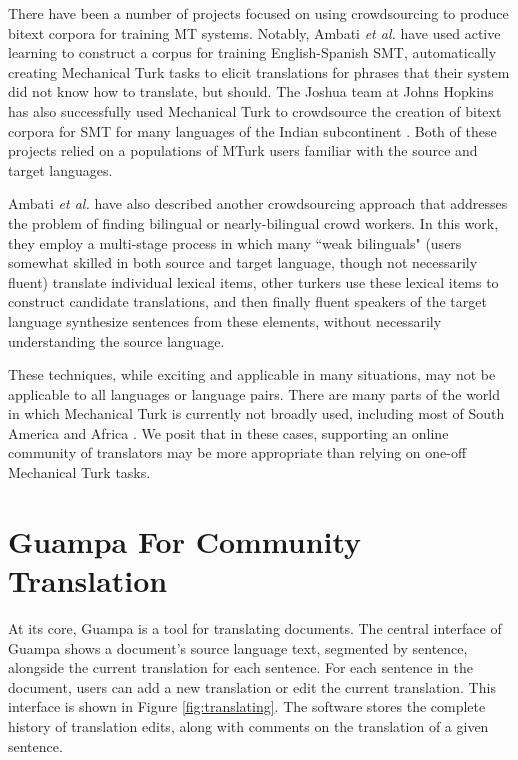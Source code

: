 \documentclass[10pt, a4paper]{article}
\begin{document}
There have been a number of projects focused on using crowdsourcing to produce
bitext corpora for training MT systems. Notably, Ambati \emph{et al.}
\cite{ambati_naacl,ambati_act} have used active learning to construct a corpus
for training English-Spanish SMT, automatically creating Mechanical Turk tasks
to elicit translations for phrases that their system did not know how to
translate, but should. The Joshua team at Johns Hopkins has also successfully
used Mechanical Turk to crowdsource the creation of bitext corpora for SMT for
many languages of the Indian subcontinent
\cite{post-callisonburch-osborne:2012:WMT}. Both of these projects relied on a
populations of MTurk users familiar with the source and target languages.

Ambati \emph{et al.} \cite{Ambati:2012:CWC:2145204.2145382} have also described
another crowdsourcing approach that addresses the problem of finding bilingual
or nearly-bilingual crowd workers. In this work, they employ a multi-stage
process in which many ``weak bilinguals" (users somewhat skilled in both source
and target language, though not necessarily fluent) translate individual
lexical items, other turkers use these lexical items to construct candidate
translations, and then finally fluent speakers of the target language
synthesize sentences from these elements, without necessarily understanding the
source language.

These techniques, while exciting and applicable in many situations, may not be
applicable to all languages or language pairs. There are many parts of the
world in which Mechanical Turk is currently not broadly used, including most of
South America and Africa \cite{Pavlick-EtAl-2014:TACL}.  We posit that in these
cases, supporting an online community of translators may be more appropriate
than relying on one-off Mechanical Turk tasks.

\section{Guampa For Community Translation}
At its core, Guampa is a tool for translating documents. The central interface
of Guampa shows a document's source language text, segmented by sentence,
alongside the current translation for each sentence. For each sentence in the
document, users can add a new translation or edit the current translation.
This interface is shown in Figure \ref{fig:translating}.
The software stores the complete history of translation edits, along with
comments on the translation of a given sentence.
\end{document}

